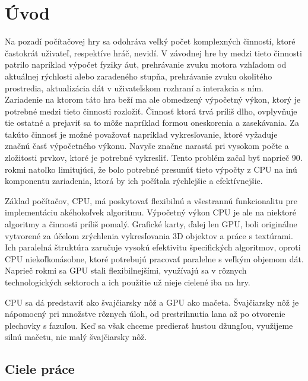 \chapter{Úvod}
\label{uvod}

Na pozadí počítačovej hry sa odohráva veľký počet komplexných činností, ktoré častokrát uživateľ, respektíve hráč, nevidí. V závodnej hre by medzi tieto činnosti patrilo napríklad výpočet fyziky áut, prehrávanie zvuku motora vzhľadom od aktuálnej rýchlosti alebo zaradeného stupňa, prehrávanie zvuku okolitého prostredia, aktualizácia dát v uživateľskom rozhraní a interakcia s ním. Zariadenie na ktorom táto hra beží ma ale obmedzený výpočetný výkon, ktorý je potrebné medzi tieto činnosti rozložiť. Činnosť ktorá trvá príliš dlho, ovplyvňuje tie ostatné a prejaviť sa to môže napríklad formou oneskorenia a zasekávania. Za takúto činnosť je možné považovať napríklad vykresľovanie, ktoré vyžaduje značnú časť výpočetného výkonu. Navyše značne narastá pri vysokom počte a zložitosti prvkov, ktoré je potrebné vykresliť. Tento problém začal byť naprieč 90. rokmi natoľko limitujúci, že bolo potrebné presunúť tieto výpočty z CPU na inú komponentu zariadenia, ktorá by ich počítala rýchlejšie a efektívnejšie.

Základ počítačov, CPU, má poskytovať flexibilnú a všestrannú funkcionalitu pre implementáciu akéhokoľvek algoritmu. Výpočetný výkon CPU je ale na niektoré algoritmy a činnosti príliš pomalý. Grafické karty, ďalej len GPU, boli originálne vytvorené za účelom zrýchlenia vykresľovania 3D objektov a práce s textúrami. Ich paralelná štruktúra zaručuje vysokú efektivitu špecifických algoritmov, oproti CPU niekoľkonásobne, ktoré potrebujú pracovať paralelne s veľkým objemom dát. Naprieč rokmi sa GPU stali flexibilnejšími, využívajú sa v rôznych technologických sektoroch a ich použitie už nieje cielené iba na hry.

CPU sa dá predstaviť ako švajčiarsky nôž a GPU ako mačeta. Švajčiarsky nôž je nápomocný pri množstve rôznych úloh, od prestrihnutia lana až po otvorenie plechovky s fazuľou. Keď sa však chceme predierať hustou džungľou, využijeme silnú mačetu, nie malý švajčiarsky nôž.

\section{Ciele práce}

